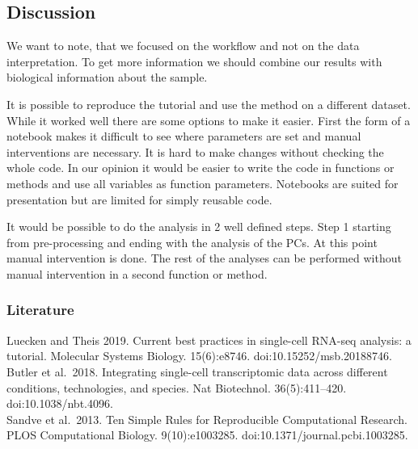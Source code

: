 \documentclass[a4paper, 10pt]{scrartcl}
\begin{document}
\hypertarget{discussion}{%
\subsection{Discussion}\label{discussion}}

We want to note, that we focused on the workflow and not on the data
interpretation. To get more information we should combine our results
with biological information about the sample.

It is possible to reproduce the tutorial and use the method on a
different dataset. While it worked well there are some options to make
it easier. First the form of a notebook makes it difficult to see where
parameters are set and manual interventions are necessary. It is hard to
make changes without checking the whole code. In our opinion it would be
easier to write the code in functions or methods and use all variables
as function parameters. Notebooks are suited for presentation but are
limited for simply reusable code.

It would be possible to do the analysis in 2 well defined steps. Step 1
starting from pre-processing and ending with the analysis of the PCs. At
this point manual intervention is done. The rest of the analyses can be
performed without manual intervention in a second function or method.

\hypertarget{literature}{%
\subsubsection{Literature}\label{literature}}

Luecken and Theis 2019. Current best practices in single-cell RNA-seq
analysis: a tutorial. Molecular Systems Biology. 15(6):e8746.
doi:10.15252/msb.20188746.\\
Butler et al.~2018. Integrating single-cell transcriptomic data across
different conditions, technologies, and species. Nat Biotechnol.
36(5):411--420. doi:10.1038/nbt.4096.\\
Sandve et al.~2013. Ten Simple Rules for Reproducible Computational
Research. PLOS Computational Biology. 9(10):e1003285.
doi:10.1371/journal.pcbi.1003285.
\end{document}
